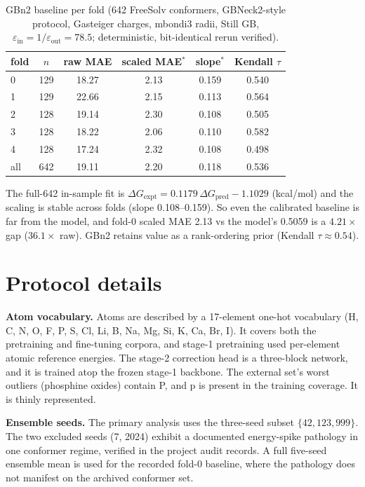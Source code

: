 \documentclass{article}
\begin{document}
\begin{table}[h]
  \caption{GBn2 baseline per fold (642 FreeSolv conformers, GBNeck2-style
  protocol, Gasteiger charges, mbondi3 radii, Still GB,
  $\varepsilon_{\text{in}} = 1/\varepsilon_{\text{out}} = 78.5$;
  deterministic, bit-identical rerun verified).}
  \label{tab:gbn2}
  \centering
  \setlength{\tabcolsep}{5pt}
  \begin{tabular}{l@{\hspace{6pt}}ccccc}
    \toprule
    fold & $n$ & raw MAE & scaled MAE$^\ast$ & slope$^\ast$ & Kendall $\tau$ \\
    \midrule
    0 & 129 & 18.27 & 2.13 & 0.159 & 0.540 \\
    1 & 129 & 22.66 & 2.15 & 0.113 & 0.564 \\
    2 & 128 & 19.14 & 2.30 & 0.108 & 0.505 \\
    3 & 128 & 18.22 & 2.06 & 0.110 & 0.582 \\
    4 & 128 & 17.24 & 2.32 & 0.108 & 0.498 \\
    \midrule
    all & 642 & 19.11 & 2.20 & 0.118 & 0.536 \\
    \bottomrule
  \end{tabular}
\end{table}

The full-642 in-sample fit is $\Delta G_{\text{expt}} = 0.1179\,
\Delta G_{\text{pred}} - 1.1029$ (kcal/mol) and the scaling is stable across
folds (slope 0.108--0.159). So even the calibrated baseline is far from the
model, and fold-0 scaled MAE 2.13 vs the model's 0.5059 is a $4.21\times$
gap ($36.1\times$ raw). GBn2 retains value as a rank-ordering prior
(Kendall $\tau \approx 0.54$).

\section{Protocol details}
\label{app:protocol}

\textbf{Atom vocabulary.} Atoms are described by a 17-element one-hot
vocabulary (H, C, N, O, F, P, S, Cl, Li, B, Na, Mg, Si, K, Ca, Br, I). It
covers both the pretraining and fine-tuning corpora, and stage-1 pretraining
used per-element atomic reference energies. The stage-2 correction head is a
three-block network, and it is trained atop the frozen stage-1 backbone. The
external set's worst outliers (phosphine oxides) contain P, and p is present in
the training coverage. It is thinly represented.

\textbf{Ensemble seeds.} The primary analysis uses the three-seed subset
$\{42, 123, 999\}$. The two excluded seeds (7, 2024) exhibit a documented
energy-spike pathology in one conformer regime, verified in the project
audit records. A full five-seed ensemble mean is used for the recorded
fold-0 baseline, where the pathology does not manifest on the archived
conformer set.
\end{document}
